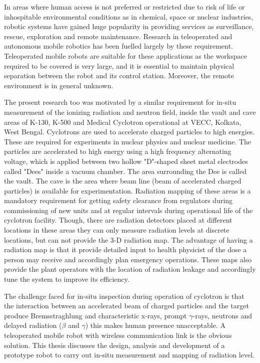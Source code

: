  In areas where human access is not preferred or restricted  due to risk of life or inhospitable environmental conditions as in chemical, space or nuclear industries, robotic systems have gained huge popularity in providing services as surveillance, rescue, exploration and remote maintenance.  Research in teleoperated and autonomous mobile robotics has been fuelled largely by these  requirement. Teleoperated mobile robots are suitable for these applications  as the workspace required to be covered is very large, and it is essential to maintain  physical separation between the robot and its control station. Moreover, the remote environment is in general unknown. 
 
 The present research too was motivated by a similar requirement for in-situ measurement of the ionizing radiation and  neutron field, inside the vault and cave areas of   K-130,  K-500  and Medical Cyclotron operational at VECC, Kolkata, West Bengal. Cyclotrons are used to accelerate  charged particles to high energies. These are required for experiments in nuclear physics and nuclear medicine. The particles are accelerated to high energy using a high frequency alternating voltage, which is applied between two hollow "D"-shaped sheet metal electrodes called "Dees" inside a vacuum chamber. The area surrounding the Dee is called the vault.  The cave is the area where beam line (beam of  accelerated charged particles) is available for experimentation. Radiation mapping of these areas is a  mandatory requirement for getting safety clearance from regulators during  commissioning of new units and at regular intervals during operational life of the cyclotron facility.   Though, there are radiation detectors placed at different locations in these areas they can only measure radiation levels at discrete locations, but can not provide the 3-D radiation  map. The advantage of having a  radiation map is that it  provide detailed  input to health physicist  of the dose a person may receive and accordingly plan emergency  operations. These maps also provide the plant operators with the location of radiation leakage and accordingly tune the system to improve its efficiency.

The challenge faced for in-situ inspection during operation of cyclotron is that the interaction  between  an  accelerated  beam   of  charged  particles  and  the  target  produce Bremsstraghlung and characteristic x-rays, prompt $\gamma$-rays, neutrons and delayed radiation ($\beta $ and $\gamma$) this makes human presence unacceptable.  A teleoperated mobile robot with wireless communication link is the obvious solution. This thesis discusses the design, analysis and development of a prototype robot  to carry out in-situ measurement and mapping of radiation level.

